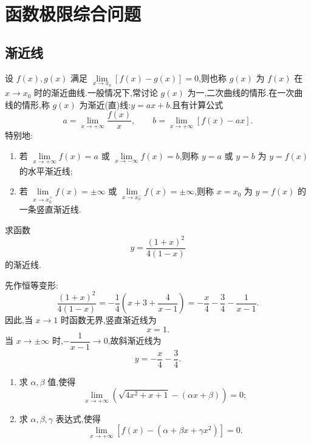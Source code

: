 \newpage

\section{函数极限综合问题}


\subsection{渐近线}

设 $f(x),g(x)$ 满足
$\displaystyle\lim\limits_{x\to x_0}[f(x)-g(x)]=0$,则也称 $g(x)$ 为 $f(x)$ 在 $x\to x_0$ 时的渐近曲线.一般情况下,常讨论 $g(x)$ 为一,二次曲线的情形.在一次曲线的情形,称 $g(x)$ 为渐近(直)线:$y=ax+b$.且有计算公式
\[
    a=\lim\limits_{x\to+\infty}\dfrac{f(x)}{x},
    \qquad
    b=\lim\limits_{x\to+\infty}[f(x)-ax].
\]
特别地:
\begin{enumerate}
    \item 若 $\displaystyle\lim\limits_{x\to+\infty}f(x)=a$ 或
          $\displaystyle\lim\limits_{x\to-\infty}f(x)=b$,则称 $y=a$ 或 $y=b$ 为 $y=f(x)$ 的水平渐近线;
    \item 若 $\displaystyle\lim\limits_{x\to x_0^+}f(x)=\pm\infty$ 或
          $\displaystyle\lim\limits_{x\to x_0^-}f(x)=\pm\infty$,则称 $x=x_0$ 为 $y=f(x)$ 的一条竖直渐近线.
\end{enumerate}

\begin{example}
    求函数
    \[
        y=\dfrac{(1+x)^2}{4(1-x)}
    \]
    的渐近线.
\end{example}
\exampleblank

\begin{solution}
    先作恒等变形:
    \[
        \dfrac{(1+x)^2}{4(1-x)}
        =-\dfrac{1}{4}\left(x+3+\dfrac{4}{x-1}\right)
        =-\dfrac{x}{4}-\dfrac{3}{4}-\dfrac{1}{x-1}.
    \]
    因此,当 $x\to1$ 时函数无界,竖直渐近线为
    \[
        x=1.
    \]
    当 $x\to\pm\infty$ 时,$-\dfrac{1}{x-1}\to0$,故斜渐近线为
    \[
        y=-\dfrac{x}{4}-\dfrac{3}{4}.
    \]
\end{solution}

\begin{example}
    \begin{enumerate}
        \item 求 $\alpha,\beta$ 值,使得
              \[
                  \displaystyle\lim\limits_{x\to+\infty}
                  \left(\sqrt{4x^2+x+1}-(\alpha x+\beta)\right)=0;
              \]
        \item 求 $\alpha,\beta,\gamma$ 表达式,使得
              \[
                  \displaystyle\lim\limits_{x\to+\infty}
                  [f(x)-(\alpha+\beta x+\gamma x^2)]=0.
              \]
    \end{enumerate}
\end{example}
\exampleblank

